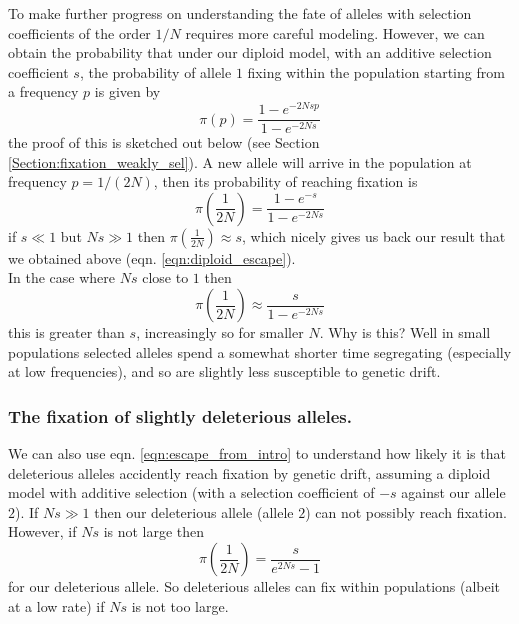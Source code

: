 To make further progress on understanding the fate of alleles with
selection coefficients of the order $1/N$ requires more careful
modeling. However, we can obtain the probability that under our diploid model, with an additive selection coefficient $s$, the
probability of allele $1$ fixing within the population starting
from a frequency $p$ is given by
\begin{equation}
\pi(p) = \frac{1-e^{-2Ns p }}{1-e^{-2Ns}} \label{eqn:prob_fixed}
\end{equation}
the proof of this is sketched out below (see Section \ref{Section:fixation_weakly_sel}). A new allele will arrive in the population at frequency $p=1/(2N)$,
then its probability of reaching fixation is
\begin{equation}
\pi \left(\frac{1}{2N} \right) = \frac{1-e^{-s }}{1-e^{-2Ns}}
\end{equation}
if $s \ll1$ but $Ns \gg 1$ then $\pi(\frac{1}{2N}) \approx s$, which
nicely gives
us back our result that we obtained above
(eqn. \eqref{eqn:diploid_escape}).\\

In the case where $Ns$ close to $1$ then
\begin{equation}
\pi(\frac{1}{2N}) \approx \frac{s}{1-e^{-2Ns}} \label{eqn:escape_from_intro}
\end{equation}
this is greater than $s$, increasingly so for smaller $N$.
Why is this? Well in small populations selected alleles spend a
somewhat shorter time segregating (especially at low frequencies), and so are
slightly less susceptible to genetic drift. \\

\subsubsection{The fixation of slightly deleterious alleles.}
We can also use eqn. \eqref{eqn:escape_from_intro} to understand how
likely it is that deleterious alleles accidently reach fixation by
genetic drift, assuming a diploid model with additive selection (with
a selection coefficient of $-s$ against our allele $2$).  
If $N s \gg 1$ then our deleterious allele (allele $2$) can not possibly reach
fixation. However, if $Ns$ is not large then
\begin{equation}
\pi(\frac{1}{2N}) = \frac{s}{e^{2Ns}-1} \label{eqn:fix_deleterious}
\end{equation}
for our deleterious allele. So deleterious alleles can fix within
populations (albeit at a low rate) if $Ns$ is not too large.\\

